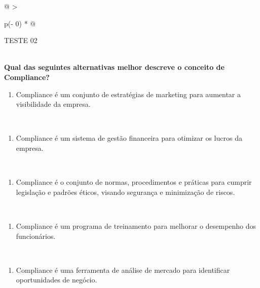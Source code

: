 \documentclass[
]{book}
\providecommand{\tightlist}{%
  \setlength{\itemsep}{0pt}\setlength{\parskip}{0pt}}
\begin{document}
\begin{longtable}[]{@{}
  >{\raggedright\arraybackslash}p{(\columnwidth - 0\tabcolsep) * }@{}}
\toprule\noalign{}
\begin{minipage}[b]{\linewidth}\raggedright
TESTE 02
\end{minipage} \\
\midrule\noalign{}
\endhead
\bottomrule\noalign{}
\endlastfoot
\textbf{Qual das seguintes alternativas melhor descreve o conceito de Compliance?} \\
\begin{minipage}[t]{\linewidth}\raggedright
\begin{enumerate}
\def\labelenumi{\alph{enumi})}
\tightlist
\item
  Compliance é um conjunto de estratégias de marketing para aumentar a visibilidade da empresa.
\end{enumerate}
\end{minipage} \\
\begin{minipage}[t]{\linewidth}\raggedright
\begin{enumerate}
\def\labelenumi{\alph{enumi})}
\setcounter{enumi}{1}
\tightlist
\item
  Compliance é um sistema de gestão financeira para otimizar os lucros da empresa.
\end{enumerate}
\end{minipage} \\
\begin{minipage}[t]{\linewidth}\raggedright
\begin{enumerate}
\def\labelenumi{\alph{enumi})}
\setcounter{enumi}{2}
\tightlist
\item
  Compliance é o conjunto de normas, procedimentos e práticas para cumprir legislação e padrões éticos, visando segurança e minimização de riscos.
\end{enumerate}
\end{minipage} \\
\begin{minipage}[t]{\linewidth}\raggedright
\begin{enumerate}
\def\labelenumi{\alph{enumi})}
\setcounter{enumi}{3}
\tightlist
\item
  Compliance é um programa de treinamento para melhorar o desempenho dos funcionários.
\end{enumerate}
\end{minipage} \\
\begin{minipage}[t]{\linewidth}\raggedright
\begin{enumerate}
\def\labelenumi{\alph{enumi})}
\setcounter{enumi}{4}
\tightlist
\item
  Compliance é uma ferramenta de análise de mercado para identificar oportunidades de negócio.
\end{enumerate}
\end{minipage} \\
\end{longtable}
\end{document}
